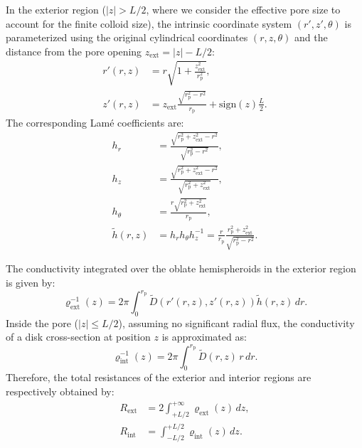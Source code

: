 \documentclass[10pt, a4paper, twocolumn]{article}
\begin{document}
In the exterior region ($|z| > L/2$, where we consider the effective pore size to account for the finite colloid size), the intrinsic coordinate system $(r', z', \theta)$ is parameterized using the original cylindrical coordinates $(r,z,\theta)$ and the distance from the pore opening $z_{\text{ext}} = |z| - L/2$:
\begin{align}
    r'(r,z) &= r\sqrt{1 + \frac{z_{\text{ext}}^2}{r_{\text{p}}^2}},\\[4pt]
    z'(r,z) &= z_{\text{ext}}\frac{\sqrt{r_{\text{p}}^2 - r^2}}{r_{\text{p}}} + \text{sign}(z)\frac{L}{2}.
\end{align}
The corresponding Lam\'e  coefficients are:
\begin{align}
    h_r &= \frac{\sqrt{r_{\text{p}}^2 + z_{\text{ext}}^2 - r^2}}{\sqrt{r_{\text{p}}^2 - r^2}},\\[4pt]
    h_z &= \frac{\sqrt{r_{\text{p}}^2 + z_{\text{ext}}^2 - r^2}}{\sqrt{r_{\text{p}}^2 + z_{\text{ext}}^2}},\\[4pt]
    h_{\theta} &= \frac{r\sqrt{r_{\text{p}}^2 + z_{\text{ext}}^2}}{r_{\text{p}}},\\[4pt]
    \tilde{h}(r,z) &= h_r h_{\theta} h_z^{-1} = \frac{r}{r_{\text{p}}}\frac{r_{\text{p}}^2 + z_{\text{ext}}^2}{\sqrt{r_{\text{p}}^2 - r^2}}.
\end{align}

The conductivity integrated over the oblate hemispheroids in the exterior region is given by:
\begin{equation}
  \label{eq:rho_ext}
  \varrho_{\text{ext}}^{-1}(z)= 2\pi\int_{0}^{r_{\text{p}}^{}} 
  \tilde{D}\left( r'(r,z), z'(r,z) \right)\tilde{h}(r,z)\,dr.
\end{equation}
Inside the pore ($|z|\leq L/2$), assuming no significant radial flux, the conductivity of a disk cross-section at position $z$ is approximated as:
\begin{equation}
  \varrho_{\text{int}}^{-1}(z)= 2\pi\int_{0}^{r_{\text{p}}^{}} \tilde{D}(r,z)\,r\,dr.
\end{equation}
Therefore, the total resistances of the exterior and interior regions are respectively obtained by:
\begin{align}
   \label{eq:R_ext}
   R_{\text{ext}} &=2\int_{+L/2}^{+\infty}\varrho_{\text{ext}}(z)\,dz,\\[5pt]
   \label{eq:R_int}
   R_{\text{int}} &=\int_{-L/2}^{+L/2}\varrho_{\text{int}}(z)\,dz.
\end{align}

\bigskip
\end{document}
